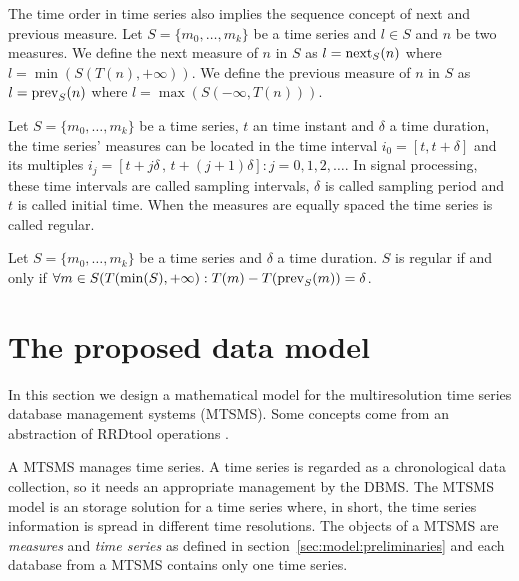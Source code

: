 The time order in time series also implies the sequence concept of
next and previous measure.  Let $S=\{m_0, \ldots, m_k\}$ be a time
series and $l\in S$ and $n$ be two measures. We define the next
measure of $n$ in $S$ as $l=\operatorname*{next}_S(n)$ where $l =
\min(S(T(n),+\infty))$. We define the previous measure of $n$ in $S$
as $l=\operatorname*{prev}_S(n)$ where $l = \max(S(-\infty,T(n)))$.



Let $S=\{m_0,\ldots,m_k\}$ be a time series, $t$ an time instant and
$\delta$ a time duration, the time series' measures can be located in
the time interval $i_0=[t,t+\delta]$ and its multiples $i_j=[t+j\delta
\,,\, t+(j+1)\delta]: j=0,1,2,\ldots$. In signal processing, these
time intervals are called sampling intervals, $\delta$ is called
sampling period and $t$ is called initial time. When the measures are
equally spaced the time series is called regular.

\begin{definition}
  Let $S=\{m_0,\ldots,m_k\}$ be a time series and $\delta$ a time
  duration. $S$ is regular if and only if $\forall m \in
  S(T(\min(S),+\infty):T(m) - T(\operatorname*{prev}_S(m)) =
  \delta$. %
\end{definition}



\section{The proposed data model}
\label{sec:MTSMS}

In this section we design a mathematical model for the multiresolution
time series database management systems (MTSMS). Some concepts come
from an abstraction of RRDtool operations \cite{rrdtool}.

A MTSMS manages time series. A time series is regarded as a
chronological data collection, so it needs an appropriate management
by the DBMS.  The MTSMS model is an storage solution for a time series
where, in short, the time series information is spread in different
time resolutions.  The objects of a MTSMS are \emph{measures} and
\emph{time series} as defined in section~\ref{sec:model:preliminaries}
and each database from a MTSMS contains only one time series.

